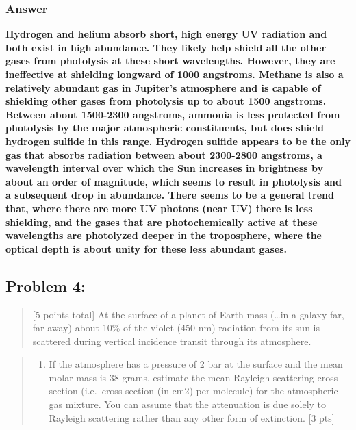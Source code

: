 \documentclass[11pt]{article}
\providecommand{\tightlist}{%
      \setlength{\itemsep}{0pt}\setlength{\parskip}{0pt}}
\begin{document}
\subsubsection{Answer}\label{answer}

\textbf{Hydrogen and helium absorb short, high energy UV radiation and
both exist in high abundance. They likely help shield all the other
gases from photolysis at these short wavelengths. However, they are
ineffective at shielding longward of 1000 angstroms. Methane is also a
relatively abundant gas in Jupiter's atmosphere and is capable of
shielding other gases from photolysis up to about 1500 angstroms.
Between about 1500-2300 angstroms, ammonia is less protected from
photolysis by the major atmospheric constituents, but does shield
hydrogen sulfide in this range. Hydrogen sulfide appears to be the only
gas that absorbs radiation between about 2300-2800 angstroms, a
wavelength interval over which the Sun increases in brightness by about
an order of magnitude, which seems to result in photolysis and a
subsequent drop in abundance. There seems to be a general trend that,
where there are more UV photons (near UV) there is less shielding, and
the gases that are photochemically active at these wavelengths are
photolyzed deeper in the troposphere, where the optical depth is about
unity for these less abundant gases.}

    \subsection{Problem 4:}\label{problem-4}

\begin{quote}
{[}5 points total{]} At the surface of a planet of Earth mass
(\ldots{}in a galaxy far, far away) about 10\% of the violet (450 nm)
radiation from its sun is scattered during vertical incidence transit
through its atmosphere.
\end{quote}

\begin{quote}
\begin{enumerate}
\def\labelenumi{(\alph{enumi})}
\tightlist
\item
  If the atmosphere has a pressure of 2 bar at the surface and the mean
  molar mass is 38 grams, estimate the mean Rayleigh scattering cross-
  section (i.e.~cross-section (in cm2) per molecule) for the atmospheric
  gas mixture. You can assume that the attenuation is due solely to
  Rayleigh scattering rather than any other form of extinction. {[}3
  pts{]}
\end{enumerate}
\end{quote}
\end{document}
